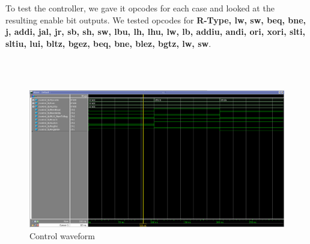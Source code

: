 \documentclass{article}
\begin{document}
To test the controller, we gave it opcodes for each case and looked at the resulting enable bit outputs. We tested opcodes for \textbf{R-Type, lw, sw, beq, bne, j, addi, jal, jr, sb, sh, sw, lbu, lh, lhu, lw, lb, addiu, andi, ori, xori, slti, sltiu, lui, bltz, bgez, beq, bne, blez, bgtz, lw, sw}.

\\ \\
\begin{figure}[!ht]
	\centering
		\includegraphics[width=1\textwidth]{control_waveform.png}
		\caption{Control waveform}
\end{figure}
\\ \\
\end{document}
